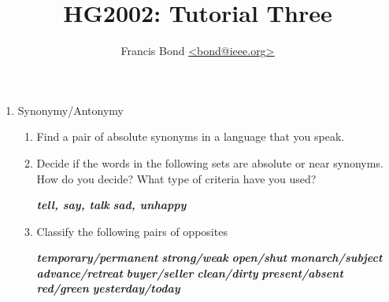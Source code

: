 \documentclass[a4paper]{article}
\title{\vspace*{-30mm}HG2002: Tutorial Three}
\author{Francis Bond \url{<bond@ieee.org>}}
\date{}%
\newcommand{\lex}[1]{\textbf{\textit{#1}}}
\begin{document}
\maketitle

\begin{enumerate}
\item Synonymy/Antonymy
  \begin{enumerate}
  \item Find a pair of absolute synonyms in a language that you speak.
  \item Decide if the words in the following sets are absolute or 
near synonyms. How do you decide? What
type of criteria have you used?
\begin{exe}
  \ex \lex{tell, say, talk}
  \ex \lex{sad, unhappy}
\end{exe}
\item  Classify the following pairs of opposites
\begin{multicols}{2}
\begin{exe}
  \ex \lex{temporary/permanent} %
  \ex \lex{strong/weak} %
  \ex \lex{open/shut} %
  \ex \lex{monarch/subject} %
  \ex \lex{advance/retreat} %
  \ex \lex{buyer/seller} %
  \ex \lex{clean/dirty} %
  \ex \lex{present/absent} %
  \ex \lex{red/green} %
  \ex \lex{yesterday/today} %
\end{exe}
\end{multicols}
\end{enumerate}


\end{enumerate}
\end{document}
